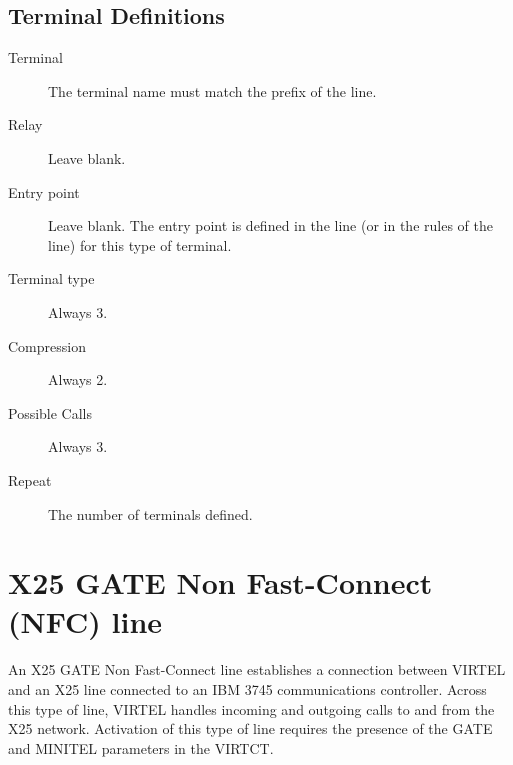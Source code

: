 \documentclass[letterpaper,10pt,english]{sphinxmanual}
\begin{document}

\ignorespaces 

\subsection{Terminal Definitions}
\label{\detokenize{connectivity_guide:index-60}}\label{\detokenize{connectivity_guide:id27}}\begin{description}
\item[{Terminal}] \leavevmode
The terminal name must match the prefix of the line.

\item[{Relay}] \leavevmode
Leave blank.

\item[{Entry point}] \leavevmode
Leave blank. The entry point is defined in the line (or in the rules of the line) for this type of terminal.

\item[{Terminal type}] \leavevmode
Always 3.

\item[{Compression}] \leavevmode
Always 2.

\item[{Possible Calls}] \leavevmode
Always 3.

\item[{Repeat}] \leavevmode
The number of terminals defined.

\end{description}

\newpage

\ignorespaces 

\section{X25 GATE Non Fast-Connect (NFC) line}
\label{\detokenize{connectivity_guide:x25-gate-non-fast-connect-nfc-line}}\label{\detokenize{connectivity_guide:v461cn-x25gateline}}\label{\detokenize{connectivity_guide:index-61}}
An X25 GATE Non Fast-Connect line establishes a connection between VIRTEL and an X25 line connected to an IBM 3745 communications controller. Across this type of line, VIRTEL handles incoming and outgoing calls to and from the X25 network. Activation of this type of line requires the presence of the GATE and MINITEL parameters in the VIRTCT.
\end{document}
